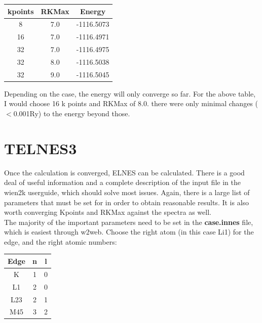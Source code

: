 \documentclass[12pt]{article}
\begin{document}
\begin{table}[H]
	\centering
\begin{tabular}{ccc}

			kpoints & RKMax & Energy \\
			\hline
			8 & 7.0 &  -1116.5073\\
			16 & 7.0 & -1116.4971\\
			32 & 7.0 & -1116.4975\\
			32 & 8.0 & -1116.5038\\
			32 & 9.0 & -1116.5045\\
			
			

\end{tabular}

\end{table}

Depending on the case, the energy will only converge so far.  For the above table, I would choose 16 k points and RKMax of 8.0.  there were only minimal changes ($<$0.001Ry) to the energy beyond those. 

\section{TELNES3}

Once the calculation is converged, ELNES can be calculated.  There is a good deal of useful information and a complete description of the input file in the wien2k userguide, which should solve most issues. Again, there is a large list of parameters that must be set for in order to obtain reasonable results. It is also worth converging Kpoints and RKMax against the spectra as well.\\
The majority of the important parameters need to be set in the \textbf{case.innes} file, which is easiest through w2web.  Choose the right atom (in this case Li1) for the edge, and the right atomic numbers:  

\begin{table}[H]
	\centering
	\begin{tabular}{ccc}
		
		Edge & n & l \\
		\hline
		K & 1 &0 \\
		L1 & 2 & 0 \\
		L23 & 2 &1\\
		M45 & 3 & 2\\
	\end{tabular}
	
\end{table}
\end{document}
